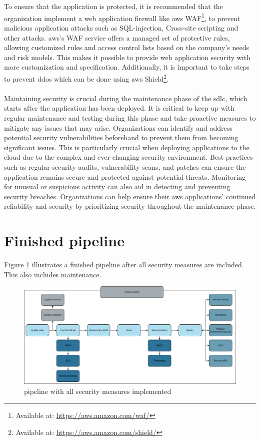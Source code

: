 \\~\\
To ensure that the application is protected, it is recommended that the organization implement a web application firewall like \acrshort{aws} WAF\footnote{Available at: \url{https://aws.amazon.com/waf/}}, to prevent malicious application attacks such as \gls{SQL-injection}, \gls{Cross-site scripting} and other attacks. \acrshort{aws}'s WAF service offers a managed set of protective rules, allowing customized rules and access control lists based on the company's needs and risk models. This makes it possible to provide web application security with more customization and specification. Additionally, it is important to take steps to prevent \gls{ddos} which can be done using \acrshort{aws} Shield\footnote{Available at: \url{https://aws.amazon.com/shield/}}.
\\~\\
Maintaining security is crucial during the maintenance phase of the \acrshort{sdlc}, which starts after the application has been deployed. It is critical to keep up with regular maintenance and testing during this phase and take proactive measures to mitigate any issues that may arise. Organizations can identify and address potential security vulnerabilities beforehand to prevent them from becoming significant issues. This is particularly crucial when deploying applications to the cloud due to the complex and ever-changing security environment. Best practices such as regular security audits, vulnerability scans, and patches can ensure the application remains secure and protected against potential threats. Monitoring for unusual or suspicious activity can also aid in detecting and preventing security breaches. Organizations can help ensure their \acrshort{aws} applications' continued reliability and security by prioritizing security throughout the maintenance phase.


\section{Finished pipeline}
Figure \ref{fig: Pipeline with all security measures implemented} illustrates a finished pipeline after all security measures are included. This also includes maintenance.  

\vspace{2mm}
\begin{figure}[H]
    \centering
    \includegraphics[width=0.8\columnwidth]{Images/FinalPipeline.png}
    \caption{\gls{pipeline} with all security measures implemented}
    \label{fig: Pipeline with all security measures implemented}
\end{figure}



